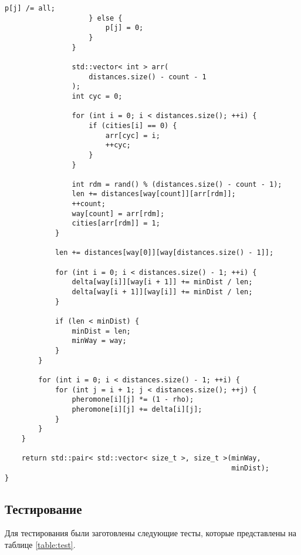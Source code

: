 \begin{lstlisting}[caption=Муравьиный алгоритм,label=lst:ant]
                        p[j] /= all;
                    } else {
                        p[j] = 0;
                    }
                }

                std::vector< int > arr(
                    distances.size() - count - 1
                );
                int cyc = 0;

                for (int i = 0; i < distances.size(); ++i) {
                    if (cities[i] == 0) {
                        arr[cyc] = i;
                        ++cyc;
                    }
                }

                int rdm = rand() % (distances.size() - count - 1);
                len += distances[way[count]][arr[rdm]];
                ++count;
                way[count] = arr[rdm];
                cities[arr[rdm]] = 1;
            }

            len += distances[way[0]][way[distances.size() - 1]];

            for (int i = 0; i < distances.size() - 1; ++i) {
                delta[way[i]][way[i + 1]] += minDist / len;
                delta[way[i + 1]][way[i]] += minDist / len;
            }

            if (len < minDist) {
                minDist = len;
                minWay = way;
            }
        }

        for (int i = 0; i < distances.size() - 1; ++i) {
            for (int j = i + 1; j < distances.size(); ++j) {
                pheromone[i][j] *= (1 - rho);
                pheromone[i][j] += delta[i][j];
            }
        }
    }

    return std::pair< std::vector< size_t >, size_t >(minWay,
                                                      minDist);
}
\end{lstlisting}

\subsection{Тестирование}

Для тестирования были заготовлены следующие тесты, которые представлены
на таблице \ref{table:test}.

